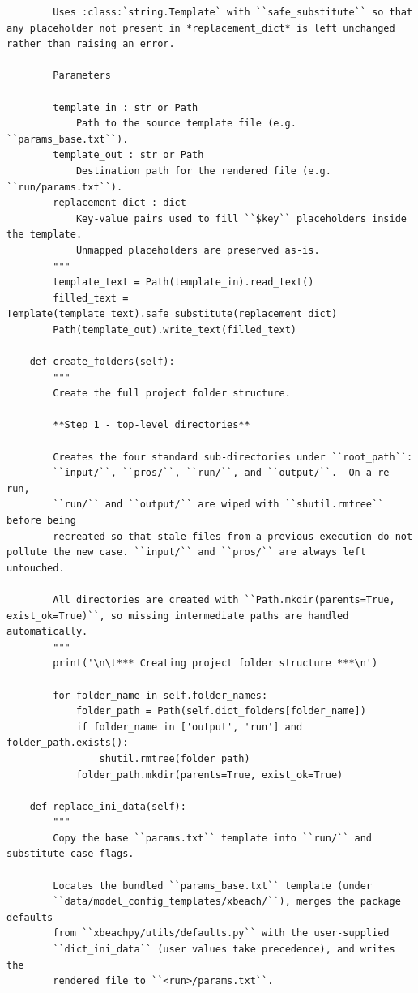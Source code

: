 \documentclass[preprint,12pt, a4paper]{elsarticle}
\begin{document}
\begin{lstlisting}
        Uses :class:`string.Template` with ``safe_substitute`` so that any placeholder not present in *replacement_dict* is left unchanged rather than raising an error.

        Parameters
        ----------
        template_in : str or Path
            Path to the source template file (e.g. ``params_base.txt``).
        template_out : str or Path
            Destination path for the rendered file (e.g. ``run/params.txt``).
        replacement_dict : dict
            Key-value pairs used to fill ``$key`` placeholders inside the template.
            Unmapped placeholders are preserved as-is.
        """
        template_text = Path(template_in).read_text()
        filled_text = Template(template_text).safe_substitute(replacement_dict)
        Path(template_out).write_text(filled_text)

    def create_folders(self):
        """
        Create the full project folder structure.

        **Step 1 - top-level directories**

        Creates the four standard sub-directories under ``root_path``:
        ``input/``, ``pros/``, ``run/``, and ``output/``.  On a re-run,
        ``run/`` and ``output/`` are wiped with ``shutil.rmtree`` before being
        recreated so that stale files from a previous execution do not pollute the new case. ``input/`` and ``pros/`` are always left untouched.

        All directories are created with ``Path.mkdir(parents=True, exist_ok=True)``, so missing intermediate paths are handled automatically.
        """
        print('\n\t*** Creating project folder structure ***\n')

        for folder_name in self.folder_names:
            folder_path = Path(self.dict_folders[folder_name])
            if folder_name in ['output', 'run'] and folder_path.exists():
                shutil.rmtree(folder_path)
            folder_path.mkdir(parents=True, exist_ok=True)

    def replace_ini_data(self):
        """
        Copy the base ``params.txt`` template into ``run/`` and substitute case flags.

        Locates the bundled ``params_base.txt`` template (under
        ``data/model_config_templates/xbeach/``), merges the package defaults
        from ``xbeachpy/utils/defaults.py`` with the user-supplied
        ``dict_ini_data`` (user values take precedence), and writes the
        rendered file to ``<run>/params.txt``.


\end{lstlisting}
\end{document}
